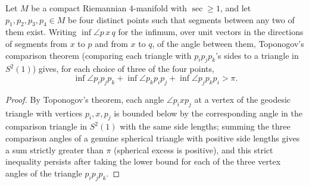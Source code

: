 \begin{lemma}
  \label{lem:pet-ch8-toponogov-angle-lower-bound}
  Let $M$ be a compact Riemannian $4$-manifold with $\sec\ge1$, and let
  $p_1,p_2,p_3,p_4\in M$ be four distinct points such that segments between any
  two of them exist. Writing $\inf\angle p\,x\,q$ for the infimum, over unit
  vectors in the directions of segments from $x$ to $p$ and from $x$ to $q$, of
  the angle between them, Toponogov's comparison theorem (comparing each
  triangle with $p_ip_jp_k$'s sides to a triangle in $S^2(1)$) gives, for each
  choice of three of the four points,
  \[
    \inf\angle p_ip_jp_k+\inf\angle p_kp_ip_j+\inf\angle p_jp_kp_i>\pi.
  \]
\end{lemma}
\begin{proof}
  By Toponogov's theorem, each angle $\angle p_ix p_j$ at a vertex of the
  geodesic triangle with vertices $p_i,x,p_j$ is bounded below by the
  corresponding angle in the comparison triangle in $S^2(1)$ with the same side
  lengths; summing the three comparison angles of a genuine spherical triangle
  with positive side lengths gives a sum strictly greater than $\pi$ (spherical
  excess is positive), and this strict inequality persists after taking the
  lower bound for each of the three vertex angles of the triangle
  $p_ip_jp_k$.
\end{proof}

